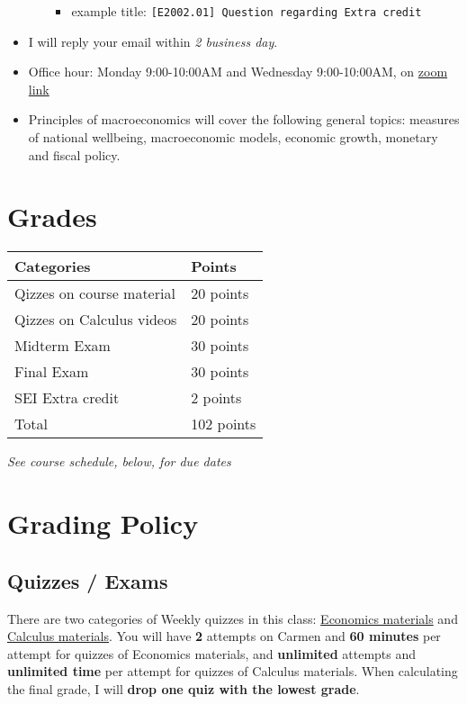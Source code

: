 \documentclass[12pt]{article}
\begin{document}
\begin{itemize}
\begin{enumerate}
        \begin{itemize}
            \item example title: \texttt{[E2002.01] Question regarding Extra credit}
        \end{itemize}
    \end{enumerate}
    \item I will reply your email within \textit{2 business day}.
    \item Office hour: Monday 9:00-10:00AM and Wednesday 9:00-10:00AM, on \href{https://osu.zoom.us/j/2532324996?pwd=c2cweEphWFMvTVZreHJ0MHNRNUdodz09}{zoom link}
    \item Principles of macroeconomics will cover the following general topics: measures of national well\-being, macroeconomic models, economic growth, monetary and fiscal policy.
\end{itemize}

\newpage

\section*{Grades}

\newlength\q
\setlength{}
\begin{tabular}{|p{\q}|p{\q}|}
    \hline
    Categories  & Points \\
    \hline
    \hline
    Qizzes on course material   & 20 points \\
    \hline
    Qizzes on Calculus videos & 20 points \\
    \hline
    Midterm Exam & 30 points \\
    \hline
    Final Exam & 30 points \\
    \hline
    SEI Extra credit & 2 points \\
    \hline
    Total & 102 points \\
    \hline
\end{tabular}
\textit{See course schedule, below, for due dates}


\section*{Grading Policy}

\subsection*{Quizzes / Exams}

There are two categories of Weekly quizzes in this class: \underline{Economics materials} and \underline{Calculus materials}.
You will have \textbf{2} attempts on Carmen and \textbf{60 minutes} per attempt for quizzes of Economics materials, and \textbf{unlimited} attempts and \textbf{unlimited time} per attempt for quizzes of Calculus materials. When calculating the final grade, I will \textbf{drop one quiz with the lowest grade}.
\end{document}
